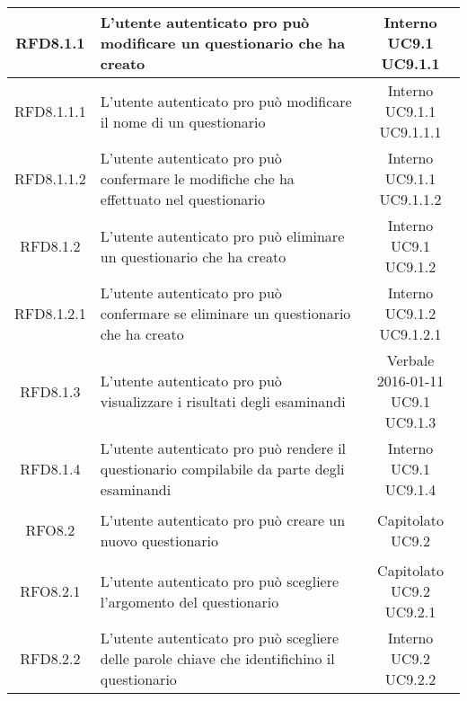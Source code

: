 \begin{longtable}{|c|>{\centering}m{7cm}|c|}
			 \hypertarget{{RFD8.1.1}}{{RFD8.1.1}} & L’utente autenticato pro può modificare un questionario che ha creato & \makecell{Interno\\ UC9.1 \\UC9.1.1 } \\ \hline
			 \hypertarget{{RFD8.1.1.1}}{{RFD8.1.1.1}} & L’utente autenticato pro può modificare il nome di un questionario & \makecell{Interno\\ UC9.1.1 \\UC9.1.1.1 } \\ \hline
			 \hypertarget{{RFD8.1.1.2}}{{RFD8.1.1.2}} & L’utente autenticato pro può confermare le modifiche che ha effettuato nel questionario & \makecell{Interno\\ UC9.1.1 \\UC9.1.1.2 } \\ \hline
			 \hypertarget{{RFD8.1.2}}{{RFD8.1.2}} & L’utente autenticato pro può eliminare un questionario che ha creato & \makecell{Interno\\ UC9.1 \\UC9.1.2 } \\ \hline
			 \hypertarget{{RFD8.1.2.1}}{{RFD8.1.2.1}} & L’utente autenticato pro può confermare se eliminare un questionario che ha creato & \makecell{Interno\\ UC9.1.2 \\UC9.1.2.1 } \\ \hline
			 \hypertarget{{RFD8.1.3}}{{RFD8.1.3}} & L’utente autenticato pro può visualizzare i risultati degli esaminandi  & \makecell{Verbale 2016-01-11\\ UC9.1 \\UC9.1.3 } \\ \hline
			 \hypertarget{{RFD8.1.4}}{{RFD8.1.4}} & L’utente autenticato pro può rendere il questionario compilabile da parte degli esaminandi & \makecell{Interno\\ UC9.1 \\UC9.1.4 } \\ \hline
			 \hypertarget{{RFO8.2}}{{RFO8.2}} & L’utente autenticato pro può creare un nuovo questionario & \makecell{Capitolato\\ UC9.2 } \\ \hline
			 \hypertarget{{RFO8.2.1}}{{RFO8.2.1}} & L’utente autenticato pro può scegliere l’argomento del questionario & \makecell{Capitolato\\ UC9.2 \\UC9.2.1 } \\ \hline
			 \hypertarget{{RFD8.2.2}}{{RFD8.2.2}} & L’utente autenticato pro può scegliere delle parole chiave che identifichino il questionario & \makecell{Interno\\ UC9.2 \\UC9.2.2 } \\ \hline

\end{longtable}
